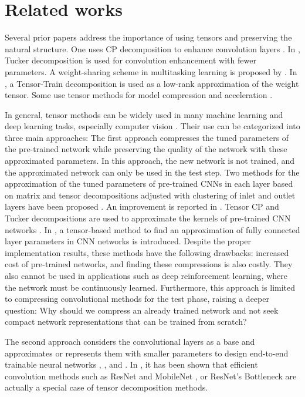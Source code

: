 \documentclass{article}
\begin{document}
\section{Related works}
\label{sec:related-works}

Several prior papers address the importance of using tensors and preserving the natural structure. One uses CP decomposition to enhance convolution layers \cite{r8}. In \cite{r9}, Tucker decomposition is used for convolution enhancement with fewer parameters. A weight-sharing scheme in multitasking learning is proposed by \cite{r10}. In \cite{r11}, a Tensor-Train decomposition is used as a low-rank approximation of the weight tensor. Some use tensor methods for model compression and acceleration \cite{r21}. 

In general, tensor methods can be widely used in many machine learning and deep learning tasks, especially computer vision \cite{r22}. Their use can be categorized into three main approaches: The first approach compresses the tuned parameters of the pre-trained network while preserving the quality of the network with these approximated parameters. In this approach, the new network is not trained, and the approximated network can only be used in the test step. Two methods for the approximation of the tuned parameters of pre-trained CNNs in each layer based on matrix and tensor decompositions adjusted with clustering of inlet and outlet layers have been proposed \cite{r23}. An improvement is reported in \cite{r24}. Tensor CP and Tucker decompositions are used to approximate the kernels of pre-trained CNN networks \cite{r25, r26, r27}. In \cite{r27}, a tensor-based method to find an approximation of fully connected layer parameters in CNN networks is introduced. Despite the proper implementation results, these methods have the following drawbacks: increased cost of pre-trained networks, and finding these compressions is also costly. They also cannot be used in applications such as deep reinforcement learning, where the network must be continuously learned. Furthermore, this approach is limited to compressing convolutional methods for the test phase, raising a deeper question: Why should we compress an already trained network and not seek compact network representations that can be trained from scratch? 

The second approach considers the convolutional layers as a base and approximates or represents them with smaller parameters to design end-to-end trainable neural networks \cite{r28}, \cite{r29}, and \cite{r30}. In \cite{r34}, it has been shown that efficient convolution methods such as ResNet and MobileNet \cite{r32}, or ResNet’s Bottleneck are actually a special case of tensor decomposition methods.
\end{document}
